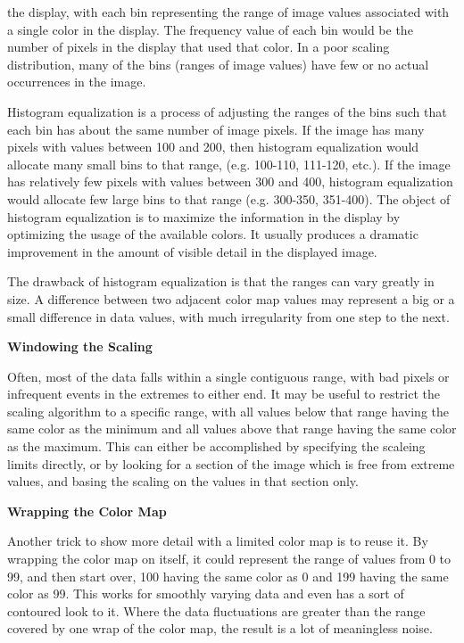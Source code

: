 the display, with each bin representing the range of image values
associated with a single color in the display.  The frequency value
of each bin would be the number of pixels in the display that used
that color.  In a poor scaling distribution, many of the bins (ranges
of image values) have few or no actual occurrences in the image.
\par
\vspace{0.1in}
Histogram equalization is a process of adjusting the ranges of the
bins such that each bin has about the same number of image pixels.
If the image has many pixels with values between 100 and 200, then
histogram equalization would allocate many small bins to that range,
(e.g. 100-110, 111-120, etc.).  If the image has relatively few
pixels with values between 300 and 400, histogram equalization would
allocate few large bins to that range (e.g. 300-350, 351-400).  The
object of histogram equalization is to maximize the information in
the display by optimizing the usage of the available colors.  It
usually produces a dramatic improvement in the amount of visible
detail in the displayed image.
\par
\vspace{0.1in}
The drawback of histogram equalization is that the ranges can vary
greatly in size.  A difference between two adjacent color map values
may represent a big or a small difference in data values, with much
irregularity from one step to the next.
\par
\vspace{0.1in}

{\bf Windowing the Scaling}
\par
\vspace{0.1in}
Often, most of the data falls within a single contiguous range, with bad
pixels or infrequent events in the extremes to either end.  It may be
useful to restrict the scaling algorithm to a specific range, with
all values below that range having the same color as the minimum and
all values above that range having the same color as the maximum.
This can either be accomplished by specifying the scaleing limits
directly, or by looking for a section of the image which is free from
extreme values, and basing the scaling on the values in that section
only.
\par
\vspace{0.1in}

{\bf Wrapping the Color Map}
\par
\vspace{0.1in}
Another trick to show more detail with a limited color map is to reuse
it.  By wrapping the color map on itself, it could represent the range
of values from 0 to 99, and then start over, 100 having the same color
as 0 and 199 having the same color as 99.  This works for smoothly
varying data and even has a sort of contoured look to it.  Where the
data fluctuations are greater than the range covered by one wrap of
the color map, the result is a lot of meaningless noise.
\par
\vspace{0.2in}

